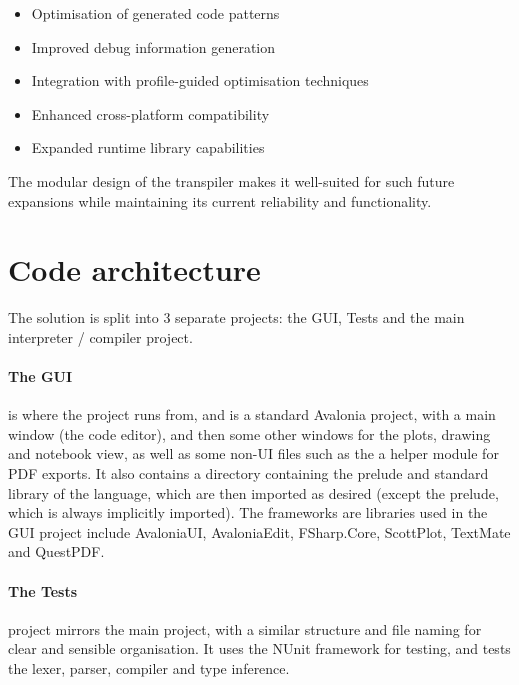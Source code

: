 \begin{itemize}[nolistsep]
\item Optimisation of generated code patterns
\item Improved debug information generation
\item Integration with profile-guided optimisation techniques
\item Enhanced cross-platform compatibility
\item Expanded runtime library capabilities
\end{itemize}

The modular design of the transpiler makes it well-suited for such future expansions while maintaining its current reliability and functionality.

\section{Code architecture}\label{sec:code-architecture}
The solution is split into 3 separate projects: the GUI, Tests and the main interpreter / compiler project.
\paragraph{The GUI} is where the project runs from, and is a standard Avalonia project, with a main window (the code editor), 
and then some other windows for the plots, drawing and notebook view, as well as some non-UI files such as the a helper 
module for PDF exports.
It also contains a directory containing the prelude and standard library of the language, which are then imported as 
desired (except the prelude, which is always implicitly imported).
The frameworks are libraries used in the GUI project include AvaloniaUI, AvaloniaEdit, FSharp.Core, ScottPlot, 
TextMate and QuestPDF\@. 
\paragraph{The Tests} project mirrors the main project, with a similar structure and file naming for clear and sensible
organisation.
It uses the NUnit framework for testing, and tests the lexer, parser, compiler and type inference.
